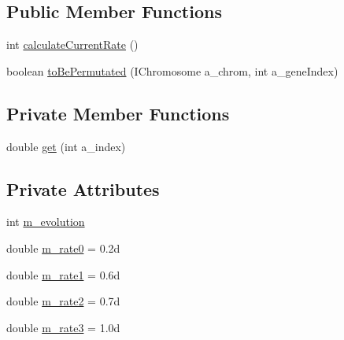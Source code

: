 \subsection*{Public Member Functions}
\begin{DoxyCompactItemize}
\item 
int \hyperlink{classexamples_1_1dynamic_mutation_1_1_dynamic_mutation_example_1_1_coins_mutation_rate_calc_a2183d8499367574803527154ce9808b6}{calculate\-Current\-Rate} ()
\item 
boolean \hyperlink{classexamples_1_1dynamic_mutation_1_1_dynamic_mutation_example_1_1_coins_mutation_rate_calc_acd41ed17033a68b250901ef41d546056}{to\-Be\-Permutated} (I\-Chromosome a\-\_\-chrom, int a\-\_\-gene\-Index)
\end{DoxyCompactItemize}
\subsection*{Private Member Functions}
\begin{DoxyCompactItemize}
\item 
double \hyperlink{classexamples_1_1dynamic_mutation_1_1_dynamic_mutation_example_1_1_coins_mutation_rate_calc_ad9966d08952872f203c1e72db59e1e82}{get} (int a\-\_\-index)
\end{DoxyCompactItemize}
\subsection*{Private Attributes}
\begin{DoxyCompactItemize}
\item 
int \hyperlink{classexamples_1_1dynamic_mutation_1_1_dynamic_mutation_example_1_1_coins_mutation_rate_calc_a3da954e31d2649518e4da534062a550f}{m\-\_\-evolution}
\item 
double \hyperlink{classexamples_1_1dynamic_mutation_1_1_dynamic_mutation_example_1_1_coins_mutation_rate_calc_ade7ce4741a3e5a78bbf48e6cdb8cfbbd}{m\-\_\-rate0} = 0.\-2d
\item 
double \hyperlink{classexamples_1_1dynamic_mutation_1_1_dynamic_mutation_example_1_1_coins_mutation_rate_calc_ad8b35f863c415cd957a70670bfdc1a19}{m\-\_\-rate1} = 0.\-6d
\item 
double \hyperlink{classexamples_1_1dynamic_mutation_1_1_dynamic_mutation_example_1_1_coins_mutation_rate_calc_a85e1e3d4f5fa8de787245bb5a04f469b}{m\-\_\-rate2} = 0.\-7d
\item 
double \hyperlink{classexamples_1_1dynamic_mutation_1_1_dynamic_mutation_example_1_1_coins_mutation_rate_calc_a987da9386c5ff26b545f489ed94fe5f4}{m\-\_\-rate3} = 1.\-0d
\end{DoxyCompactItemize}


